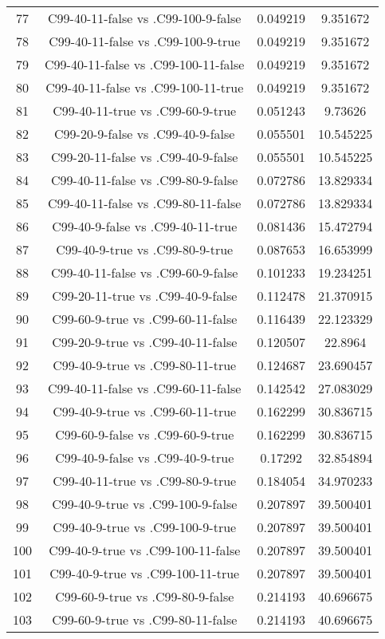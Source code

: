 \documentclass[a4paper,10pt]{article}
\begin{document}
\begin{landscape}
\begin{table}[!htp]
\begin{tabular}{cccc}
77&C99-40-11-false vs .C99-100-9-false&0.049219&9.351672\\
78&C99-40-11-false vs .C99-100-9-true&0.049219&9.351672\\
79&C99-40-11-false vs .C99-100-11-false&0.049219&9.351672\\
80&C99-40-11-false vs .C99-100-11-true&0.049219&9.351672\\
81&C99-40-11-true vs .C99-60-9-true&0.051243&9.73626\\
82&C99-20-9-false vs .C99-40-9-false&0.055501&10.545225\\
83&C99-20-11-false vs .C99-40-9-false&0.055501&10.545225\\
84&C99-40-11-false vs .C99-80-9-false&0.072786&13.829334\\
85&C99-40-11-false vs .C99-80-11-false&0.072786&13.829334\\
86&C99-40-9-false vs .C99-40-11-true&0.081436&15.472794\\
87&C99-40-9-true vs .C99-80-9-true&0.087653&16.653999\\
88&C99-40-11-false vs .C99-60-9-false&0.101233&19.234251\\
89&C99-20-11-true vs .C99-40-9-false&0.112478&21.370915\\
90&C99-60-9-true vs .C99-60-11-false&0.116439&22.123329\\
91&C99-20-9-true vs .C99-40-11-false&0.120507&22.8964\\
92&C99-40-9-true vs .C99-80-11-true&0.124687&23.690457\\
93&C99-40-11-false vs .C99-60-11-false&0.142542&27.083029\\
94&C99-40-9-true vs .C99-60-11-true&0.162299&30.836715\\
95&C99-60-9-false vs .C99-60-9-true&0.162299&30.836715\\
96&C99-40-9-false vs .C99-40-9-true&0.17292&32.854894\\
97&C99-40-11-true vs .C99-80-9-true&0.184054&34.970233\\
98&C99-40-9-true vs .C99-100-9-false&0.207897&39.500401\\
99&C99-40-9-true vs .C99-100-9-true&0.207897&39.500401\\
100&C99-40-9-true vs .C99-100-11-false&0.207897&39.500401\\
101&C99-40-9-true vs .C99-100-11-true&0.207897&39.500401\\
102&C99-60-9-true vs .C99-80-9-false&0.214193&40.696675\\
103&C99-60-9-true vs .C99-80-11-false&0.214193&40.696675\\

\end{tabular}
\end{table}
\end{landscape}
\end{document}
